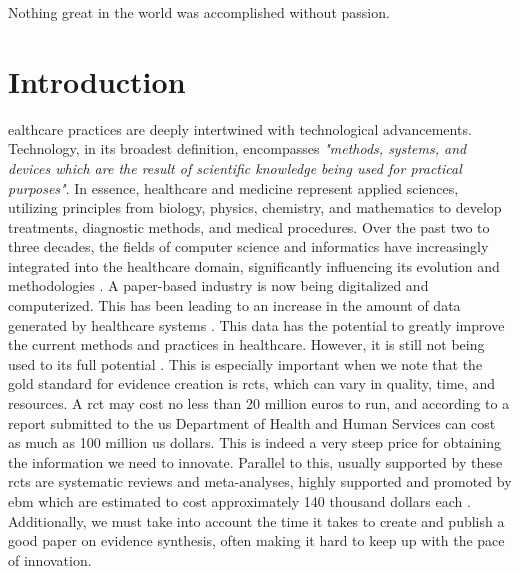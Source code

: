 

\begin{savequote}[85mm]
    Nothing great in the world was accomplished 
    without passion.
    \end{savequote}


\chapter{Introduction} \label{chap:intro}

\acresetall

ealthcare practices are deeply intertwined with technological advancements. Technology, in its broadest definition, encompasses \textit{"methods, systems, and devices which are the result of scientific knowledge being used for practical purposes"}. In essence, healthcare and medicine represent applied sciences, utilizing principles from biology, physics, chemistry, and mathematics to develop treatments, diagnostic methods, and medical procedures. Over the past two to three decades, the fields of computer science and informatics have increasingly integrated into the healthcare domain, significantly influencing its evolution and methodologies \cite{adler-milsteinHITECHActDrove2017}. A paper-based industry is now being digitalized and computerized. This has been leading to an increase in the amount of data generated by healthcare systems \cite{kruseUseElectronicHealth2018,palabindalaAdoptionElectronicHealth2016}. 
This data has the potential to greatly improve the current methods and practices in healthcare. However, it is still not being used to its full potential \cite{kruseUseElectronicHealth2018,dicamilloGuestEditorialData2020}. This is especially important when we note that the gold standard for evidence creation is \acp{rct}, which can vary in quality, time, and resources. A \ac{rct} may cost no less than 20 million euros to run, and according to a report submitted to the \ac{us} Department of Health and Human Services \cite{sertkayaaylinEXAMINATIONCLINICALTRIAL2014} can cost as much as 100 million \ac{us} dollars. This is indeed a very steep price for obtaining the information we need to innovate. Parallel to this, usually supported by these \acp{rct} are systematic reviews and meta-analyses, highly supported and promoted by \ac{ebm} which are estimated to cost approximately 140 thousand dollars each \cite{michelsonSignificantCostSystematic2019}. Additionally, we must take into account the time it takes to create and publish a good paper on evidence synthesis, often making it hard to keep up with the pace of innovation.

